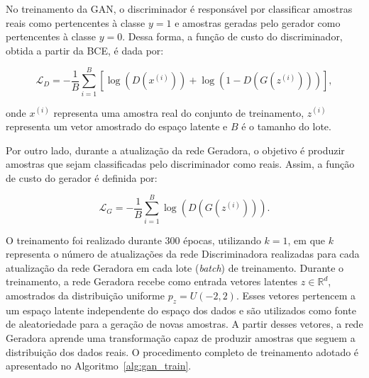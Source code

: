 \documentclass[10pt,a4paper]{article}
\begin{document}
No treinamento da GAN, o discriminador é responsável por classificar
amostras reais como pertencentes à classe $y=1$ e amostras geradas pelo
gerador como pertencentes à classe $y=0$. Dessa forma, a função de custo
do discriminador, obtida a partir da BCE, é dada por:

\begin{equation}
\mathcal{L}_D
=
-\frac{1}{B}
\sum_{i=1}^{B}
\left[
\log(D(x^{(i)}))
+
\log(1-D(G(z^{(i)})))
\right],
\label{eq:loss_discriminator}
\end{equation}

onde $x^{(i)}$ representa uma amostra real do conjunto de treinamento,
$z^{(i)}$ representa um vetor amostrado do espaço latente e $B$ é o
tamanho do lote.

Por outro lado, durante a atualização da rede Geradora, o objetivo é
produzir amostras que sejam classificadas pelo discriminador como reais.
Assim, a função de custo do gerador é definida por:

\begin{equation}
\mathcal{L}_G
=
-\frac{1}{B}
\sum_{i=1}^{B}
\log(D(G(z^{(i)}))).
\label{eq:loss_generator}
\end{equation}

O treinamento foi realizado durante 300 épocas, utilizando $k=1$, em que $k$ representa o número de atualizações da rede Discriminadora realizadas para cada atualização da rede Geradora em cada lote (\textit{batch}) de treinamento. Durante o treinamento, a rede Geradora recebe como entrada vetores latentes $z \in \mathbb{R}^{d}$, amostrados da distribuição uniforme $p_z = U(-2,2)$. Esses vetores pertencem a um espaço latente independente do espaço dos dados e são utilizados como fonte de aleatoriedade para a geração de novas amostras. A partir desses vetores, a rede Geradora aprende uma transformação capaz de produzir amostras que seguem a distribuição dos dados reais. O procedimento completo de treinamento adotado é apresentado no Algoritmo~\ref{alg:gan_train}.
\end{document}
